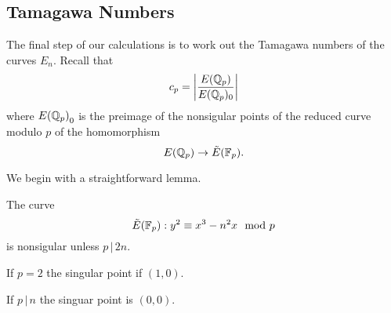 \documentclass[12pt, a4paper]{amsart}
\begin{document}
\subsection{Tamagawa Numbers}

The final step of our calculations is to work out the Tamagawa numbers of the
curves $E_n$. Recall that
\[ c_p = \left| \frac{E({\mathbb Q}_p)}{E({\mathbb Q}_p)_0} \right|\]
where ${E({\mathbb Q}_p)}_0$ is the preimage of the nonsigular points of the reduced curve
modulo $p$ of the homomorphism
\[ {E({\mathbb Q}_p)} \rightarrow {\tilde{E}(\mathbb{F}_p)}.\]

We begin with a straightforward lemma.

\begin{lemma} \label{singularity_condition}
  The curve
  \[ {\tilde{E}(\mathbb{F}_p)} : y^2 \equiv x^3 - n^2x \mod{p}\]
  is nonsigular unless $p \, | \, 2n$.

  If $p = 2$ the singular point if $(1,0)$.

  If $p \, | \, n$ the singuar point is $(0,0)$.

\end{lemma}
\end{document}

